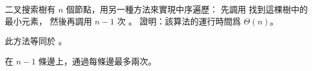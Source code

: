 \startEXERCISE
二叉搜索樹有 $n$ 個節點，用另一種方法來實現中序遍歷：
先調用  找到這棵樹中的最小元素，
然後再調用 $n-1$ 次 。
證明：該算法的運行時間爲 $\Theta(n)$。
\stopEXERCISE

\startANSWER
此方法等同於 。

在 $n-1$ 條邊上，通過每條邊最多兩次。
\stopANSWER
